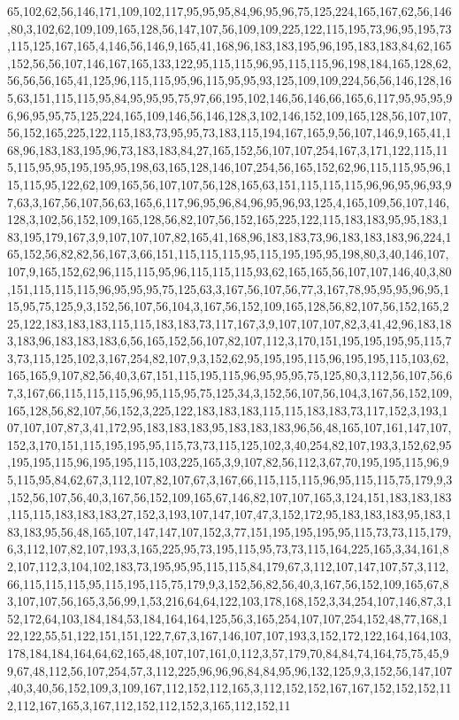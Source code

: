 65,102,62,56,146,171,109,102,117,95,95,95,84,96,95,96,75,125,224,165,167,62,56,146,80,3,102,62,109,109,165,128,56,147,107,56,109,109,225,122,115,195,73,96,95,195,73,115,125,167,165,4,146,56,146,9,165,41,168,96,183,183,195,96,195,183,183,84,62,165,152,56,56,107,146,167,165,133,122,95,115,115,96,95,115,115,96,198,184,165,128,62,56,56,56,165,41,125,96,115,115,95,96,115,95,95,93,125,109,109,224,56,56,146,128,165,63,151,115,115,95,84,95,95,95,75,97,66,195,102,146,56,146,66,165,6,117,95,95,95,96,96,95,95,75,125,224,165,109,146,56,146,128,3,102,146,152,109,165,128,56,107,107,56,152,165,225,122,115,183,73,95,95,73,183,115,194,167,165,9,56,107,146,9,165,41,168,96,183,183,195,96,73,183,183,84,27,165,152,56,107,107,254,167,3,171,122,115,115,115,95,95,195,195,95,198,63,165,128,146,107,254,56,165,152,62,96,115,115,95,96,115,115,95,122,62,109,165,56,107,107,56,128,165,63,151,115,115,115,96,96,95,96,93,97,63,3,167,56,107,56,63,165,6,117,96,95,96,84,96,95,96,93,125,4,165,109,56,107,146,128,3,102,56,152,109,165,128,56,82,107,56,152,165,225,122,115,183,183,95,95,183,183,195,179,167,3,9,107,107,107,82,165,41,168,96,183,183,73,96,183,183,183,96,224,165,152,56,82,82,56,167,3,66,151,115,115,115,95,115,195,195,95,198,80,3,40,146,107,107,9,165,152,62,96,115,115,95,96,115,115,115,93,62,165,165,56,107,107,146,40,3,80,151,115,115,115,96,95,95,95,75,125,63,3,167,56,107,56,77,3,167,78,95,95,95,96,95,115,95,75,125,9,3,152,56,107,56,104,3,167,56,152,109,165,128,56,82,107,56,152,165,225,122,183,183,183,115,115,183,183,73,117,167,3,9,107,107,107,82,3,41,42,96,183,183,183,96,183,183,183,6,56,165,152,56,107,82,107,112,3,170,151,195,195,195,95,115,73,73,115,125,102,3,167,254,82,107,9,3,152,62,95,195,195,115,96,195,195,115,103,62,165,165,9,107,82,56,40,3,67,151,115,195,115,96,95,95,95,75,125,80,3,112,56,107,56,67,3,167,66,115,115,115,96,95,115,95,75,125,34,3,152,56,107,56,104,3,167,56,152,109,165,128,56,82,107,56,152,3,225,122,183,183,183,115,115,183,183,73,117,152,3,193,107,107,107,87,3,41,172,95,183,183,183,95,183,183,183,96,56,48,165,107,161,147,107,152,3,170,151,115,195,195,95,115,73,73,115,125,102,3,40,254,82,107,193,3,152,62,95,195,195,115,96,195,195,115,103,225,165,3,9,107,82,56,112,3,67,70,195,195,115,96,95,115,95,84,62,67,3,112,107,82,107,67,3,167,66,115,115,115,96,95,115,115,75,179,9,3,152,56,107,56,40,3,167,56,152,109,165,67,146,82,107,107,165,3,124,151,183,183,183,115,115,183,183,183,27,152,3,193,107,147,107,47,3,152,172,95,183,183,183,95,183,183,183,95,56,48,165,107,147,147,107,152,3,77,151,195,195,195,95,115,73,73,115,179,6,3,112,107,82,107,193,3,165,225,95,73,195,115,95,73,73,115,164,225,165,3,34,161,82,107,112,3,104,102,183,73,195,95,95,115,115,84,179,67,3,112,107,147,107,57,3,112,66,115,115,115,95,115,195,115,75,179,9,3,152,56,82,56,40,3,167,56,152,109,165,67,83,107,107,56,165,3,56,99,1,53,216,64,64,122,103,178,168,152,3,34,254,107,146,87,3,152,172,64,103,184,184,53,184,164,164,125,56,3,165,254,107,107,254,152,48,77,168,122,122,55,51,122,151,151,122,7,67,3,167,146,107,107,193,3,152,172,122,164,164,103,178,184,184,164,64,62,165,48,107,107,161,0,112,3,57,179,70,84,84,74,164,75,75,45,99,67,48,112,56,107,254,57,3,112,225,96,96,96,84,84,95,96,132,125,9,3,152,56,147,107,40,3,40,56,152,109,3,109,167,112,152,112,165,3,112,152,152,167,167,152,152,152,112,112,167,165,3,167,112,152,112,152,3,165,112,152,11